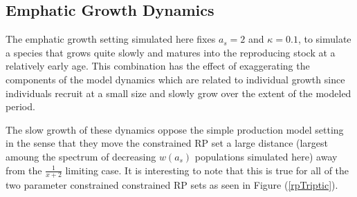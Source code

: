 
\subsection{Emphatic Growth Dynamics}

%
The emphatic growth setting simulated here fixes $a_s=2$ and $\kappa=0.1$, to
simulate a species that grows quite slowly and matures into the reproducing  
stock at a relatively early age. This combination has the effect of 
exaggerating the components of the model dynamics which are related to
individual growth since individuals recruit at a small size and slowly
grow over the extent of the modeled period.

%
The slow growth of these dynamics oppose the simple production model setting
in the sense that they move the constrained RP set a large distance (largest
amoung the spectrum of decreasing $w(a_s)$ populations simulated here)
away from the $\frac{1}{x+2}$ limiting case. It is interesting to note that
this is true for all of the two parameter constrained constrained RP sets as
seen in Figure (\ref{rpTriptic}).

